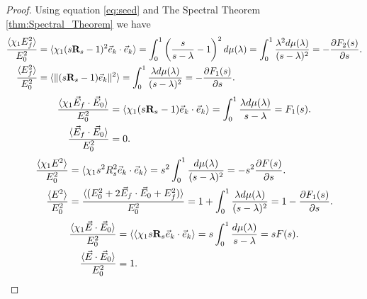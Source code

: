 \documentclass[english,12pt]{ttuthes}
\begin{document}
\begin{proof}
  Using equation \eqref{eq:seed} and The
  Spectral Theorem \ref{thm:Spectral_Theorem} we have
%  
  \begin{align*}
  \frac{\langle\chi_1E_f^2\rangle}{E_0^2}&= \langle\chi_1(s\mathbf{R}_s-1)^2\vec{e}_k\cdot\vec{e}_k\rangle
             =\int_0^1 \left(\frac{s}{s-\lambda} -1\right)^2 d\mu(\lambda)
             =\int_0^1 \frac{\lambda^2d\mu(\lambda)}{(s-\lambda)^2}=-\frac{\partial F_2(s)}{\partial s}. \\
  \frac{\langle E_f^2\rangle}{E_0^2}&=  \langle\|(s\mathbf{R}_s-1)\vec{e}_k\|^2 \rangle
                  =\int_0^1\frac{\lambda d\mu(\lambda)}{(s-\lambda)^2}=-\frac{\partial F_1(s)}{\partial s}.\notag 
\end{align*}
%
\begin{align*}
  \frac{\langle\chi_1\vec{E}_f\cdot\vec{E}_0\rangle}{E_0^2}&=
     \langle\chi_1(s\mathbf{R}_s-1)\vec{e}_k\cdot\vec{e}_k \rangle
     =\int_0^1\frac{\lambda d\mu(\lambda)}{s-\lambda}=F_1(s).\\
  \frac{\langle\vec{E}_f\cdot\vec{E}_0\rangle}{E_0^2}&= 0. \notag
\end{align*}
%
\begin{align*}
  \frac{\langle\chi_1E^2\rangle}{E_0^2}&= \langle\chi_1s^2R^2_s\vec{e}_k\cdot\vec{e}_k \rangle
           =s^2\int_0^1\frac{d\mu(\lambda)}{(s-\lambda)^2}=-s^2\frac{\partial F(s)}{\partial s}.\\
 \frac{\langle E^2\rangle}{E_0^2}&=  \frac{\langle(E_0^2+2\vec{E}_f\cdot\vec{E}_0+E_f^2)\rangle}{E_0^2} 
  =1+\int_0^1\frac{\lambda d\mu(\lambda)}{(s-\lambda)^2}=1-\frac{\partial F_1(s)}{\partial s}.\notag
\end{align*}
%
\begin{align*}
  \frac{\langle\chi_1\vec{E}\cdot\vec{E}_0\rangle}{E_0^2}&=
      \langle\langle\chi_1s\mathbf{R}_s\vec{e}_k\cdot\vec{e}_k\rangle
       =s\int_0^1\frac{d\mu(\lambda)}{s-\lambda}=sF(s).\\
  \frac{\langle\vec{E}\cdot\vec{E}_0\rangle}{E_0^2}&= 1.\notag 

\end{align*}
\end{proof}
\end{document}
